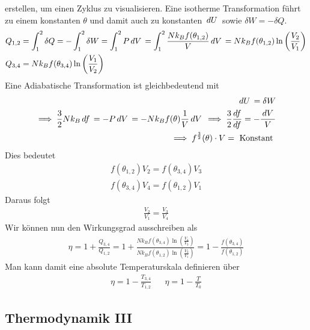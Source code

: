 \begin{description}
    erstellen, um einen Zyklus zu visualisieren. Eine isotherme Transformation
    f\"uhrt zu einem konstanten $\theta$ und damit auch zu konstanten
    $ \,dU\, $ sowie $\delta W = -\delta Q$.
    \begin{align*}
      Q_{1,2} & = \int_{1}^{2} \delta Q =  - \int_{1}^{2} \delta W = 
      \int_{1}^{2} P \,dV\, = \int_{1}^{2} \frac{N k_B f (\theta_{1,2})}{V}
      \,d V\, = N k_B f(\theta_{1,2}) \ln{\left( \frac{V_2}{V_1} \right)} \\
      Q_{3,4} & = N k_B f(\theta_{3,4}) \ln{\left( \frac{V_1}{V_2} \right)}
    \end{align*}
    Eine Adiabatische Transformation ist gleichbedeutend mit
    \begin{align*}
      \,dU\, = \delta W \\
      \implies \frac{3}{2 } N k_B \,df\, = - P \,dV\, = - N k_B f(\theta) 
      \frac{1}{V} \,dV\,
      \implies \frac{3}{2} \frac{d{f}}{d{f}} = - \frac{\,dV\,}{V} \\
      \implies f^{\frac{3}{2}}(\theta) \cdot V = \text{ Konstant }
    \end{align*}
    Dies bedeutet
    \begin{align*}
      f(\theta_{1,2}) V_2 = f(\theta_{3,4}) V_3 \\
      f(\theta_{3,4}) V_4 = f(\theta_{1,2}) V_1 
    \end{align*}
    Daraus folgt
    \begin{align*}
      \frac{V_2}{V_1} = \frac{V_3}{V_4}
    \end{align*}
    Wir k\"onnen nun den Wirkungsgrad ausschreiben als
    \begin{align*}
      \eta = 1 + \frac{Q_{3,4}}{Q_{1,2}} = 1 + \frac{N k_B f(\theta_{3,4}) \ln{\left( \frac{V_4}{V_3} \right)}}{
      N k_B f(\theta_{1,2}) \ln{\left( \frac{V_2}{V_1} \right)}} 
      = 1 - \frac{f(\theta_{3,4})}{f(\theta_{1,2})} 
    \end{align*}
    Man kann damit eine absolute Temperaturskala definieren über 
    \begin{align*}
      \eta = 1 - \frac{T_{3,4}}{T_{1,2}} && \eta = 1 - \frac{T}{T_0}
    \end{align*}
\end{description}

\subsection*{Thermodynamik III}

